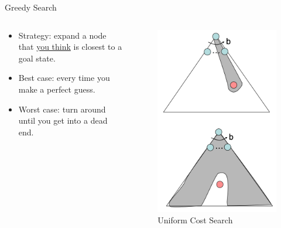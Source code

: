 \documentclass{beamer}
\begin{document}
\begin{frame}{Greedy Search}
    \begin{columns}
        \begin{column}{.6\textwidth}
            \begin{itemize}
                \item Strategy: expand a node that \underline{you think}
                is closest to a goal state.

                \item Best case: every time you make a perfect guess.

                \item Worst case: turn around until you get into a dead end.
            \end{itemize}
        \end{column}

        \begin{column}{.5\textwidth}
            \begin{figure}[htpb]
                \centering
                \includegraphics[width=0.8\linewidth]{pic/greedy.png}
                \caption{Uniform Cost Search}
            \end{figure}
        \end{column}
    \end{columns}
\end{frame}
\end{document}
